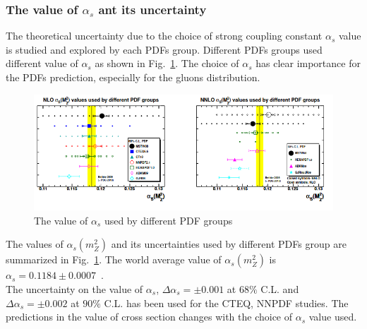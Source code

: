 \subsubsection{The value of $\alpha_{s}$ ant its uncertainty}
The theoretical uncertainty due to the choice of strong coupling constant $\alpha_{s}$ value is studied and explored by each PDFs group. Different PDFs groups used different value of $\alpha_{s}$ as shown in Fig.~\ref{alpha}. The choice of $\alpha_{s}$ has clear importance for the PDFs prediction, especially for the gluons distribution.
\begin{figure}[H]
\centering
\includegraphics[scale=0.5]{chapter3/alpha.png}
\caption{The value of $\alpha_{s}$ used by different PDF groups}
\label{alpha}
\end{figure}
The values of $\alpha_{s}(m_{Z}^{2})$ and its uncertainties used by different PDFs  group are summarized in Fig.~\ref{alpha}. The world average value of $\alpha_{s}(m_{Z}^{2})$ is $\alpha_{s} = 0.1184 \pm 0.0007$~\cite{Martin_2009}.\\
The uncertainty on the value of $\alpha_{s}$, $\Delta\alpha_{s}=\pm0.001$ at $68\%$ C.L. and $\Delta\alpha_{s}=\pm0.002$ at $90\%$ C.L. has been used for the CTEQ, NNPDF studies. The predictions in the value of cross section changes with the choice of $\alpha_{s}$ value used. \\
